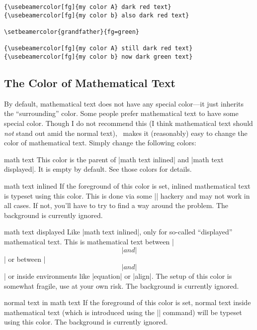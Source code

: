 \begin{command}{\setbeamercolor\opt{|*|}}
\begin{itemize}
\begin{verbatim}
{\usebeamercolor[fg]{my color A} dark red text}
{\usebeamercolor[fg]{my color b} also dark red text}

\setbeamercolor{grandfather}{fg=green}

{\usebeamercolor[fg]{my color A} still dark red text}
{\usebeamercolor[fg]{my color b} now dark green text}
\end{verbatim}
  \end{itemize}
\end{command}




\subsection{The Color of Mathematical Text}

By default, mathematical text does not have any special color---it
just inherits the ``surrounding'' color. Some people prefer
mathematical text to have some special color. Though I do not
recommend this (I think mathematical text should \emph{not} stand out
amid the normal text), \beamer\ makes it (reasonably) easy to change
the color of mathematical text. Simply change the following colors:

\begin{element}{math text}\no\yes\no
  This color is the parent of |math text inlined| and
  |math text displayed|. It is empty by default. See those colors for
  details.
\end{element}

\begin{element}{math text inlined}\no\yes\no
  If the foreground of this color is set, inlined mathematical text is
  typeset using this color. This is done via some |\everymath| hackery
  and may not work in all cases. If not, you'll have to try to find a
  way around the problem. The background is currently
  ignored.
\end{element}

\begin{element}{math text displayed}\no\yes\no
  Like |math text inlined|, only for so-called ``displayed''
  mathematical text. This is mathematical text between |\[| and |\]| or
  between |$$| and |$$| or inside environments like |equation| or
  |align|. The setup of this color is somewhat fragile, use at your
  own risk. The background is currently
  ignored.
\end{element}

\begin{element}{normal text in math text}\no\yes\no
  If the foreground of this color is set, normal text inside
  mathematical text (which is introduced using the |\text| command)
  will be typeset using this color. The background is currently
  ignored.
\end{element}



